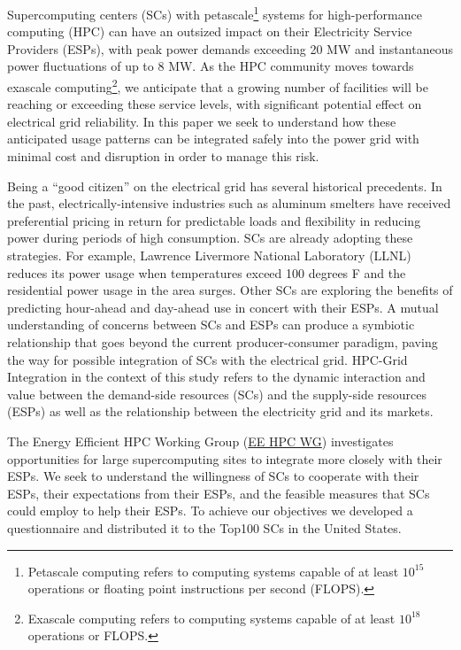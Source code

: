 Supercomputing centers (SCs) with petascale\footnote{Petascale computing refers to computing systems capable of at
least \(10^{15}\) operations or floating point instructions per second (FLOPS).} 
systems for high-performance computing (HPC) can have an outsized 
impact on their Electricity Service Providers (ESPs), with peak 
power demands %
exceeding 20 MW and instantaneous power fluctuations of up to 8 MW. 
As the HPC community moves towards exascale computing\footnote{Exascale computing refers to computing systems capable of at
least \(10^{18}\) operations or FLOPS.}, we anticipate that a growing number of facilities will
be reaching or exceeding these service levels, with significant potential 
effect on electrical grid reliability.
In this paper we seek to understand how these anticipated
usage patterns can be integrated safely into the power grid with minimal cost 
and disruption in order to manage
this risk.

Being a ``good citizen'' on the electrical grid has several historical precedents.
In the past, electrically-intensive industries such as aluminum smelters 
have received preferential pricing in return for predictable loads and
flexibility in reducing power during periods of high consumption.
SCs are already adopting these strategies. 
For example, Lawrence Livermore National Laboratory (LLNL)
reduces its power usage when temperatures exceed 
100 degrees F and the residential power usage in the area surges.
Other %
SCs are exploring the benefits of predicting hour-ahead and 
day-ahead use in concert with their %
ESPs.
A mutual understanding of concerns between SCs and ESPs can 
produce a symbiotic relationship that goes beyond the current producer-consumer 
paradigm, paving the way for possible integration of %
SCs with the electrical grid. HPC-Grid Integration in the context of this study refers to the dynamic interaction and value between the demand-side resources (SCs) and the supply-side resources (ESPs) as well as the relationship between the electricity grid and its markets.

The Energy Efficient HPC Working Group (\href {http://eehpcwg.lbl.gov/}{EE HPC WG}) 
investigates opportunities for large supercomputing sites to 
integrate more closely with their ESPs.
We seek to understand the willingness of SCs to
cooperate with their ESPs, their expectations from their ESPs, and the feasible measures
that SCs could employ to help their ESPs.
To achieve our objectives we developed a questionnaire and distributed it to 
the Top100 SCs in the United States. 

